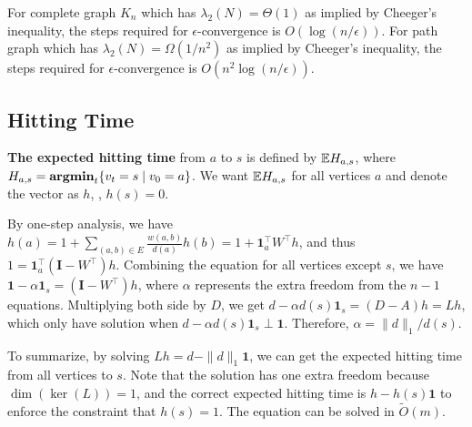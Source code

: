 For complete graph $K_n$ which has $\lambda_2(N) = \Theta(1)$ as implied by Cheeger's inequality, the steps required for $\epsilon$-convergence is $O(\log(n/\epsilon))$. For path graph which has $\lambda_2(N) =\Omega(1/n^2)$ as implied by Cheeger's inequality, the steps required for $\epsilon$-convergence is $O(n^2 \log (n/\epsilon))$.
\subsection{Hitting Time}

\textbf{The expected hitting time} from $a$ to $s$ is defined by $\mathbb{E} H_{a,s}$, where $H_{a,s} = \operatorname{\textbf{argmin}}_t\{v_t=s\mid v_0=a\}$. We want $\mathbb{E} H_{a,s}$ for all vertices $a$ and denote the vector as $h$, \eg, $h(s)=0$.

By one-step analysis, we have $h(a) = 1+\sum_{(a,b)\in E} \frac{w(a,b)}{d(a)} h(b) = 1+\boldsymbol{1}_a^\top W^\top h$, and thus $1 = \boldsymbol{1}_a^\top (\boldsymbol{I}-W^\top)h$. Combining the equation for all vertices except $s$, we have $\boldsymbol{1} - \alpha \boldsymbol{1}_s = (\boldsymbol{I}-W^\top)h$, where $\alpha$ represents the extra freedom from the $n-1$ equations. Multiplying both side by $D$, we get $d - \alpha d(s) \boldsymbol{1}_s = (D-A)h = Lh$, which only have solution when $d - \alpha d(s) \boldsymbol{1}_s \perp \boldsymbol{1}$. Therefore, $\alpha = \|d\|_1 / d(s)$. 

To summarize, by solving $Lh = d - \|d\|_1 \boldsymbol{1}$, we can get the expected hitting time from all vertices to $s$. Note that the solution has one extra freedom because $\dim(\ker(L))=1$, and the correct expected hitting time is $h - h(s)\boldsymbol{1}$ to enforce the constraint that $h(s)=1$. The equation can be solved in $\tilde{O}(m)$.